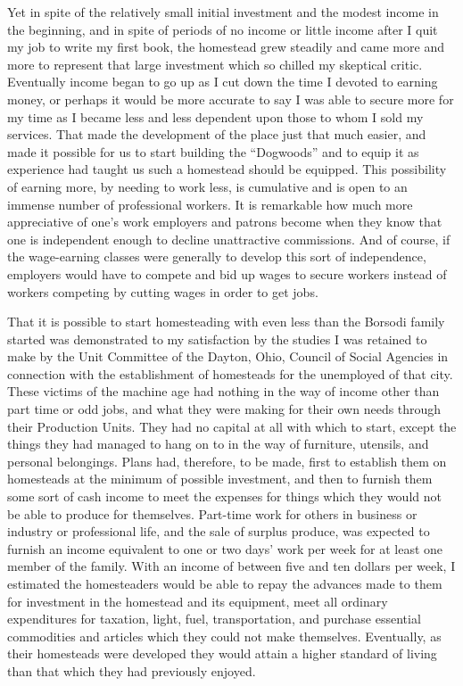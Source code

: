 \documentclass{book}
\begin{document}
Yet in spite of the relatively small initial investment and the modest income in the beginning, and in spite of periods of no income or little income after I quit my job to write my first book, the homestead grew steadily and came more and more to represent that large investment which so chilled my skeptical critic. Eventually income began to go up as I cut down the time I devoted to earning money, or perhaps it would be more accurate to say I was able to secure more for my time as I became less and less dependent upon those to whom I sold my services. That made the development of the place just that much easier, and made it possible for us to start building the “Dogwoods” and to equip it as experience had taught us such a homestead should be equipped. This possibility of earning more, by needing to work less, is cumulative and is open to an immense number of professional workers. It is remarkable how much more appreciative of one’s work employers and patrons become when they know that one is independent enough to decline unattractive commissions. And of course, if the wage-earning classes were generally to develop this sort of independence, employers would have to compete and bid up wages to secure workers instead of workers competing by cutting wages in order to get jobs.

That it is possible to start homesteading with even less than the Borsodi family started was demonstrated to my satisfaction by the studies I was retained to make by the Unit Committee of the Dayton, Ohio, Council of Social Agencies in connection with the establishment of homesteads for the unemployed of that city. These victims of the machine age had nothing in the way of income other than part time or odd jobs, and what they were making for their own needs through their Production Units. They had no capital at all with which to start, except the things they had managed to hang on to in the way of furniture, utensils, and personal belongings. Plans had, therefore, to be made, first to establish them on homesteads at the minimum of possible investment, and then to furnish them some sort of cash income to meet the expenses for things which they would not be able to produce for themselves. Part-time work for others in business or industry or professional life, and the sale of surplus produce, was expected to furnish an income equivalent to one or two days’ work per week for at least one member of the family. With an income of between five and ten dollars per week, I estimated the homesteaders would be able to repay the advances made to them for investment in the homestead and its equipment, meet all ordinary expenditures for taxation, light, fuel, transportation, and purchase essential commodities and articles which they could not make themselves. Eventually, as their homesteads were developed they would attain a higher standard of living than that which they had previously enjoyed.
\end{document}
